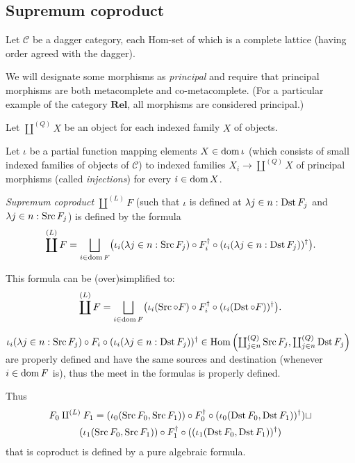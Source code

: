 \subsection{Supremum coproduct}

Let $\mathcal{C}$ be a dagger category, each Hom-set of which is a complete
lattice (having order agreed with the dagger).

We will designate some morphisms as \emph{principal} and require that
principal morphisms are both metacomplete and co-metacomplete. (For a
particular example of the category $\mathbf{Rel}$, all morphisms are
considered principal.)

Let $\coprod^{(Q)} X$ be an object for each indexed family $X$ of objects.

Let $\iota$ be a partial function mapping elements $X \in \operatorname{dom} \iota$
(which consists of small indexed families of objects of $\mathcal{C}$) to
indexed families $X_i \rightarrow \coprod^{(Q)} X$ of principal morphisms
(called \emph{injections}) for every $i \in \operatorname{dom} X$.

\begin{defn}
  \emph{Supremum coproduct} $\coprod^{(L)} F$ (such that $\iota$ is defined
  at $\lambda j \in n : \operatorname{Dst} F_j$ and $\lambda j \in n : \operatorname{Src}
  F_j$) is defined by the formula
  \[ \coprod^{(L)} F = \bigsqcup_{i \in \dom F} \bigl(\iota_i(\lambda j \in n
     : \Src F_j) \circ F_i^{\dagger} \circ (\iota_i(\lambda j \in n :
     \Dst F_j))^{\dagger}\bigr) . \]
\end{defn}

This formula can be (over)simplified to:
\[ \coprod^{(L)} F = \bigsqcup_{i \in \dom F} \bigl(\iota_i(\Src \circ
   F) \circ F_i^{\dagger} \circ (\iota_i(\Dst \circ F))^{\dagger}\bigr) .
\]

\begin{rem}
  $\iota_i(\lambda j \in n : \operatorname{Src} F_j) \circ F_i \circ (\iota_i(\lambda
  j \in n : \operatorname{Dst} F_j))^{\dagger} \in \operatorname{Hom} \left(
  \coprod^{(Q)}_{j \in n} \operatorname{Src} F_j , \coprod^{(Q)}_{j \in n} \operatorname{Dst}
  F_j \right)$ are properly defined and have the same sources and destination
  (whenever $i \in \operatorname{dom} F$ is), thus the meet in the formulas is
  properly defined.
\end{rem}

\begin{rem}
  Thus
  \begin{multline*}
    F_0 \amalg^{(L)} F_1 = (\iota_0(\operatorname{Src} F_0 , \operatorname{Src} F_1)) \circ
    F_0^{\dagger} \circ (\iota_0(\operatorname{Dst} F_0 , \operatorname{Dst}
    F_1))^{\dagger}) \sqcup\\ (\iota_1(\operatorname{Src} F_0 , \operatorname{Src} F_1))
    \circ F_1^{\dagger} \circ ((\iota_1(\operatorname{Dst} F_0 , \operatorname{Dst}
    F_1))^{\dagger})
  \end{multline*}
  that is coproduct is defined by a pure algebraic formula.
\end{rem}

